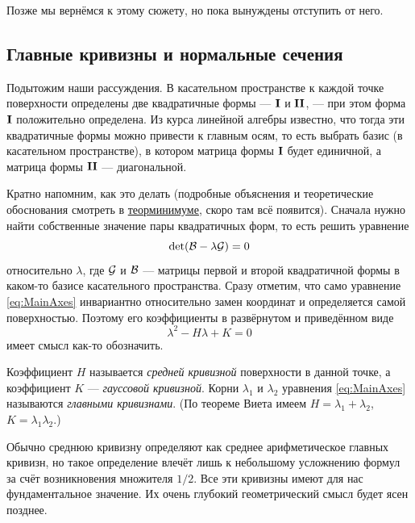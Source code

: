 \noindent%
Позже мы вернёмся к этому сюжету, но пока вынуждены отступить от него.

\subsection{Главные кривизны и нормальные сечения}

Подытожим наши рассуждения. В касательном пространстве к каждой точке поверхности определены две квадратичные формы --- $\boldsymbol{\operatorname{I}}$ и $\boldsymbol{\operatorname{II}}$, --- при этом форма $\boldsymbol{\operatorname{I}}$ положительно определена. Из курса линейной алгебры известно, что тогда эти квадратичные формы можно привести к главным осям, то есть выбрать базис (в касательном пространстве), в котором матрица формы $\boldsymbol{\operatorname{I}}$ будет единичной, а матрица формы $\boldsymbol{\operatorname{II}}$ --- диагональной.


Кратно напомним, как это делать (подробные объяснения и теоретические обоснования смотреть в \href{https://github.com/pshenikita/Linal-Teormin}{теорминимуме}, скоро там всё появится). Сначала нужно найти собственные значение пары квадратичных форм, то есть решить уравнение
\begin{equation} \label{eq:MainAxes}
	\det(\mathcal{B} - \lambda\mathcal{G}) = 0
\end{equation}
относительно $\lambda$, где $\mathcal{G}$ и $\mathcal{B}$ --- матрицы первой и второй квадратичной формы в каком-то базисе касательного пространства. Сразу отметим, что само уравнение \eqref{eq:MainAxes} инвариантно относительно замен координат и определяется самой поверхностью. Поэтому его коэффициенты в развёрнутом и приведённом виде
\[
	\lambda^2 -H\lambda + K = 0
\]
имеет смысл как-то обозначить.

\begin{definition}
	Коэффициент $H$ называется \textit{средней кривизной} поверхности в данной точке\footnotemark, а коэффициент $K$ --- \textit{гауссовой кривизной}. Корни $\lambda_1$ и $\lambda_2$ уравнения \eqref{eq:MainAxes} называются \textit{главными кривизнами}. (По теореме Виета имеем $H = \lambda_1 + \lambda_2$, $K = \lambda_1\lambda_2$.)
\end{definition}


Обычно среднюю кривизну определяют как среднее арифметическое главных кривизн, но такое определение влечёт лишь к небольшому усложнению формул за счёт возникновения множителя $1 / 2$. Все эти кривизны имеют для нас фундаментальное значение. Их очень глубокий геометрический смысл будет ясен позднее.

